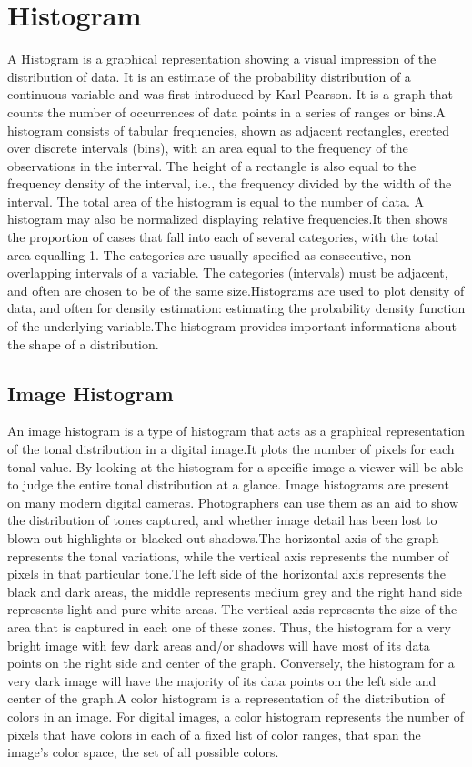 \documentclass[10pt,a4paper]{article}
\begin{document}
\section{Histogram}
A Histogram is a graphical representation showing a visual impression of the distribution of data. It is an estimate of the probability distribution of a continuous variable and was first introduced by Karl Pearson. It is a graph that counts the number of occurrences of data points in a series of ranges or bins.A histogram consists of tabular frequencies, shown as adjacent rectangles, erected over discrete intervals (bins), with an area equal to the frequency of the observations in the interval. The height of a rectangle is also equal to the frequency density of the interval, i.e., the frequency divided by the width of the interval. The total area of the histogram is equal to the number of data. A histogram may also be normalized displaying relative frequencies.It then shows the proportion of cases that fall into each of several categories, with the total area equalling 1. The categories are usually specified as consecutive, non-overlapping intervals of a variable. The categories (intervals) must be adjacent, and often are chosen to be of the same size.Histograms are used to plot density of data, and often for density estimation: estimating the probability density function of the underlying variable.The histogram provides important informations about the shape of a distribution.

\subsection{Image Histogram}
An image histogram is a type of histogram that acts as a graphical representation of the tonal distribution in a digital image.It plots the number of pixels for each tonal value. By looking at the histogram for a specific image a viewer will be able to judge the entire tonal distribution at a glance.
Image histograms are present on many modern digital cameras. Photographers can use them as an aid to show the distribution of tones captured, and whether image detail has been lost to blown-out highlights or blacked-out shadows.The horizontal axis of the graph represents the tonal variations, while the vertical axis represents the number of pixels in that particular tone.The left side of the horizontal axis represents the black and dark areas, the middle represents medium grey and the right hand side represents light and pure white areas. The vertical axis represents the size of the area that is captured in each one of these zones. Thus, the histogram for a very bright image with few dark areas and/or shadows will have most of its data points on the right side and center of the graph. Conversely, the histogram for a very dark image will have the majority of its data points on the left side and center of the graph.A color histogram is a representation of the distribution of colors in an image. For digital images, a color histogram represents the number of pixels that have colors in each of a fixed list of color ranges, that span the image's color space, the set of all possible colors.
\end{document}
